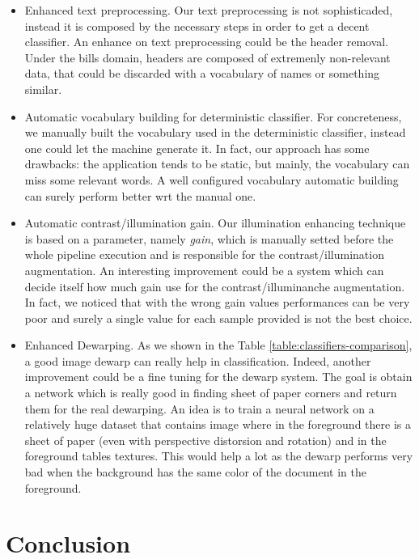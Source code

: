 \documentclass[10pt,twocolumn,letterpaper]{article}
\begin{document}
\begin{itemize}
  \item Enhanced text preprocessing. Our text preprocessing is not
    sophisticaded, instead it is composed by the necessary steps in
    order to get a decent classifier. An enhance on text preprocessing
    could be the header removal. Under the bills domain, headers are
    composed of extremenly non-relevant data, that could be discarded
    with a vocabulary of names or something similar.
  \item Automatic vocabulary building for deterministic
    classifier. For concreteness, we manually built the vocabulary
    used in the deterministic classifier, instead one could let the
    machine generate it. In fact, our approach has some drawbacks: the
    application tends to be static, but mainly, the vocabulary can
    miss some relevant words. A well configured vocabulary automatic
    building can surely perform better wrt the manual one.
  \item Automatic contrast/illumination gain. Our illumination
    enhancing technique is based on a parameter, namely \emph{gain},
    which is manually setted before the whole pipeline execution and
    is responsible for the contrast/illumination augmentation. An
    interesting improvement could be a system which can decide itself
    how much gain use for the contrast/illuminanche augmentation. In
    fact, we noticed that with the wrong gain values performances can
    be very poor and surely a single value for each sample provided
    is not the best choice.
  \item Enhanced Dewarping. As we shown in the Table
    \ref{table:classifiers-comparison}, a good image dewarp can really
    help in classification. Indeed, another improvement could be a
    fine tuning for the dewarp system. The goal is obtain a network
    which is really good in finding sheet of paper corners and return
    them for the real dewarping. An idea is to train a neural network
    on a relatively huge dataset that contains image where in the
    foreground there is a sheet of paper (even with perspective
    distorsion and rotation) and in the foreground tables
    textures. This would help a lot as the dewarp performs very bad
    when the background has the same color of the document in the
    foreground.
\end{itemize}

\section{Conclusion}
\label{sec:conclusion}
\end{document}
